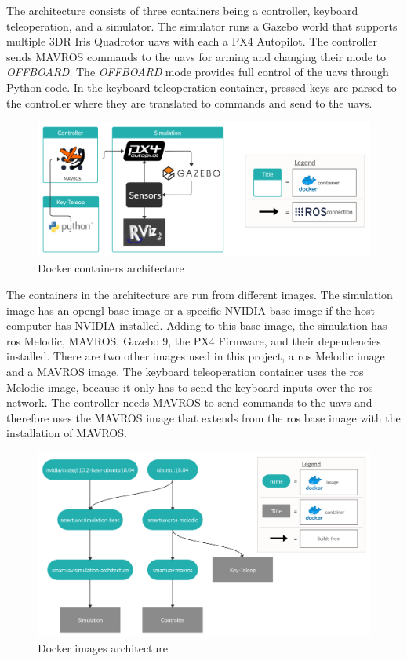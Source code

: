 The architecture consists of three containers being a controller, keyboard teleoperation, and a simulator. The simulator runs a Gazebo world that supports multiple 3DR Iris Quadrotor \acsp{uav} with each a PX4 Autopilot. The controller sends MAVROS commands to the \acsp{uav} for arming and changing their mode to \textit{OFFBOARD}. The \textit{OFFBOARD} mode provides full control of the \acsp{uav} through Python code. In the keyboard teleoperation container, pressed keys are parsed to the controller where they are translated to commands and send to the \acsp{uav}.

\begin{figure}[!h]
  \centering
  \includegraphics[width=
  \linewidth]{images/architecture_containers.png}
  \caption{Docker containers architecture}
\end{figure}

\clearpage

The containers in the architecture are run from different images. The simulation image has an \acs{opengl} base image or a specific NVIDIA base image if the host computer has NVIDIA installed. Adding to this base image, the simulation has \acs{ros} Melodic, MAVROS, Gazebo 9, the PX4 Firmware, and their dependencies installed. There are two other images used in this project, a \acs{ros} Melodic image and a MAVROS image. The keyboard teleoperation container uses the \acs{ros} Melodic image, because it only has to send the keyboard inputs over the \acs{ros} network. The controller needs MAVROS to send commands to the \acsp{uav} and therefore uses the MAVROS image that extends from the \acs{ros} base image with the installation of MAVROS.

\begin{figure}[!h]
  \centering
  \includegraphics[width=\linewidth]{images/architecture_images.png}
  \caption{Docker images architecture}
\end{figure}

